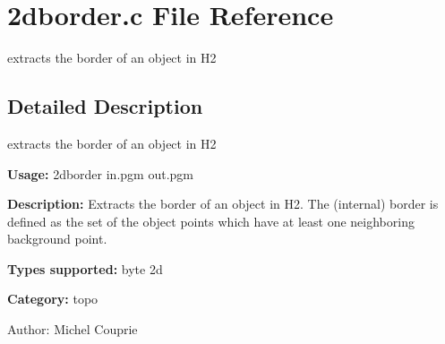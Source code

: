 \section{2dborder.c File Reference}
\label{2dborder_8c}
extracts the border of an object in H2 



\subsection{Detailed Description}
extracts the border of an object in H2 

{\bf Usage:} 2dborder in.pgm out.pgm

{\bf Description:} Extracts the border of an object in H2. The (internal) border is defined as the set of the object points which have at least one neighboring background point.

{\bf Types supported:} byte 2d

{\bf Category:} topo

\begin{Desc}
\item[Author:]Michel Couprie \end{Desc}

